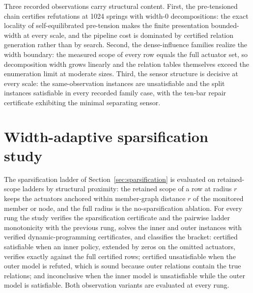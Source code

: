 \documentclass[11pt]{article}
\theoremstyle{plain}
\theoremstyle{definition}
\theoremstyle{remark}
\begin{document}
Three recorded observations carry structural content.  First, the
pre-tensioned chain certifies refutations at 1024 springs with width-0
decompositions: the exact locality of self-equilibrated pre-tension makes
the finite presentation bounded-width at every scale, and the pipeline cost
is dominated by certified relation generation rather than by search.  Second,
the dense-influence families realize the width boundary: the measured scope
of every row equals the full actuator set, so decomposition width grows
linearly and the relation tables themselves exceed the enumeration limit at
moderate sizes.  Third, the sensor structure is decisive at every scale: the
same-observation instances are unsatisfiable and the split instances
satisfiable in every recorded family case, with the ten-bar repair
certificate exhibiting
the minimal separating sensor.

\section{Width-adaptive sparsification study}
\label{sec:sparsification-study}

The sparsification ladder of Section~\ref{sec:sparsification} is evaluated
on retained-scope ladders by structural proximity: the retained scope of a
row at radius \(r\) keeps the actuators anchored within member-graph
distance \(r\) of the monitored member or node, and the full radius is the
no-sparsification ablation.  For every rung the study verifies the
sparsification certificate and the pairwise ladder monotonicity with the
previous rung, solves the inner and outer instances with verified
dynamic-programming certificates, and classifies the bracket: certified
satisfiable when an inner policy, extended by zeros on the omitted
actuators, verifies exactly against the full certified rows; certified
unsatisfiable when the outer model is refuted, which is sound because outer
relations contain the true relations; and inconclusive when the inner model
is unsatisfiable while the outer model is satisfiable.  Both observation
variants are evaluated at every rung.
\end{document}
